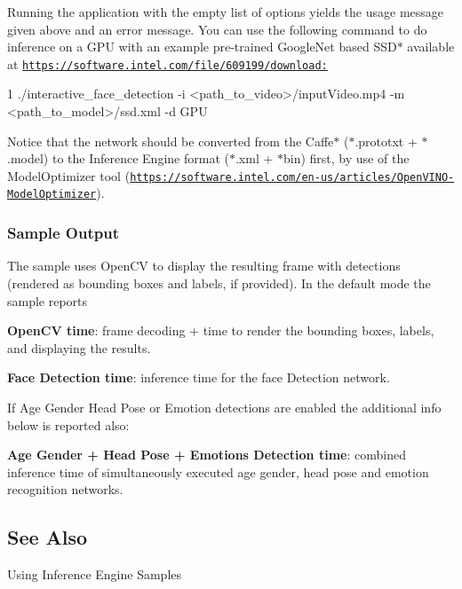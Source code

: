 Running the application with the empty list of options yields the usage message given above and an error message. You can use the following command to do inference on a G\+PU with an example pre-\/trained Google\+Net based S\+S\+D$\ast$ available at \href{https://software.intel.com/file/609199/download:}{\tt https\+://software.\+intel.\+com/file/609199/download\+:} 
\begin{DoxyCode}
1 ./interactive\_face\_detection -i <path\_to\_video>/inputVideo.mp4 -m <path\_to\_model>/ssd.xml -d GPU
\end{DoxyCode}
 Notice that the network should be converted from the Caffe$\ast$ ($\ast$.prototxt + $\ast$.model) to the Inference Engine format ($\ast$.xml + $\ast$bin) first, by use of the Model\+Optimizer tool (\href{https://software.intel.com/en-us/articles/OpenVINO-ModelOptimizer}{\tt https\+://software.\+intel.\+com/en-\/us/articles/\+Open\+V\+I\+N\+O-\/\+Model\+Optimizer}).

\subsubsection*{Sample Output}

The sample uses Open\+CV to display the resulting frame with detections (rendered as bounding boxes and labels, if provided). In the default mode the sample reports
\begin{DoxyItemize}
\item {\bfseries Open\+CV time}\+: frame decoding + time to render the bounding boxes, labels, and displaying the results.
\item {\bfseries Face Detection time}\+: inference time for the face Detection network.
\end{DoxyItemize}

If Age Gender Head Pose or Emotion detections are enabled the additional info below is reported also\+:
\begin{DoxyItemize}
\item {\bfseries Age Gender + Head Pose + Emotions Detection time}\+: combined inference time of simultaneously executed age gender, head pose and emotion recognition networks.
\end{DoxyItemize}

\subsection*{See Also}


\begin{DoxyItemize}
\item Using Inference Engine Samples 
\end{DoxyItemize}